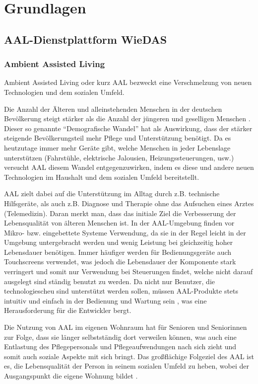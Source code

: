 \chapter{Grundlagen}
\label{grundlagen}

\section{AAL-Dienstplattform WieDAS}

\subsection{Ambient Assisted Living}

Ambient Assisted Living oder kurz AAL bezweckt eine Verschmelzung von neuen Technologien und
dem sozialen Umfeld.

Die Anzahl der Älteren und alleinstehenden Menschen in der deutschen Bevölkerung steigt stärker
als die Anzahl der jüngeren und geselligen Menschen \cite{aaldeu}.
Dieser so genannte ``Demografische Wandel'' hat als Auswirkung, dass der stärker steigende Bevölkerungsteil
mehr Pflege und Unterstützung benötigt.
Da es heutzutage immer mehr Geräte gibt, welche Menschen in jeder Lebenslage unterstützen (Fahrstühle, elektrische
Jalousien, Heizungssteuerungen, usw.) versucht AAL diesem Wandel entgegenzuwirken, indem es diese und andere neuen
Technologien im Haushalt und dem sozialen Umfeld bereitstellt.

AAL zielt dabei auf die Unterstützung im Alltag durch z.B. technische Hilfsgeräte, als auch
z.B. Diagnose und Therapie ohne das Aufsuchen eines Arztes (Telemedizin).
Daran merkt man, dass das initiale Ziel die Verbesserung der Lebensqualität von älteren
Menschen ist.
In der AAL-Umgebung finden vor Mikro- bzw. eingebettete Systeme Verwendung, da sie in der Regel
leicht in der Umgebung untergebracht werden und wenig Leistung bei gleichzeitig hoher Lebensdauer
benötigen.
Immer häufiger werden für Bedienungsgeräte auch Touchscreens verwendet, was jedoch die Lebensdauer
der Komponente stark verringert und somit nur Verwendung bei Steuerungen findet, welche nicht darauf
ausgelegt sind ständig benutzt zu werden.
Da nicht nur Benutzer, die technologiescheu sind unterstützt werden sollen, müssen AAL-Produkte
stets intuitiv und einfach in der Bedienung und Wartung sein \cite{aaldeu}, was eine Herausforderung für
die Entwickler bergt.

Die Nutzung von AAL im eigenen Wohnraum hat für Senioren und Seniorinnen zur Folge, dass sie
länger selbstständig dort verweilen können, was auch eine Entlastung des Pflegepersonals und
Pflegeaufwendungen nach sich zieht und somit auch soziale Aspekte mit sich bringt.
Das großflächige Folgeziel des AAL ist es, die Lebensqualität der Person in seinem sozialen Umfeld zu heben,
wobei der Ausgangspunkt die eigene Wohnung bildet \cite{aaldeu}.


